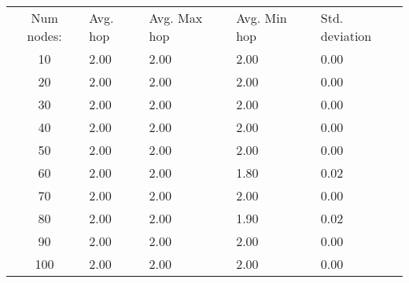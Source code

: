 \begin{tabular}{cllll}
Num nodes: & Avg. hop & Avg. Max hop & Avg. Min hop & Std. deviation \\
10       & 2.00        & 2.00            & 2.00 & 0.00 \\
20       & 2.00        & 2.00            & 2.00 & 0.00 \\
30       & 2.00        & 2.00            & 2.00 & 0.00 \\
40       & 2.00        & 2.00            & 2.00 & 0.00 \\
50       & 2.00        & 2.00            & 2.00 & 0.00 \\
60       & 2.00        & 2.00            & 1.80 & 0.02 \\
70       & 2.00        & 2.00            & 2.00 & 0.00 \\
80       & 2.00        & 2.00            & 1.90 & 0.02 \\
90       & 2.00        & 2.00            & 2.00 & 0.00 \\
100       & 2.00        & 2.00            & 2.00 & 0.00 \\
\end{tabular}